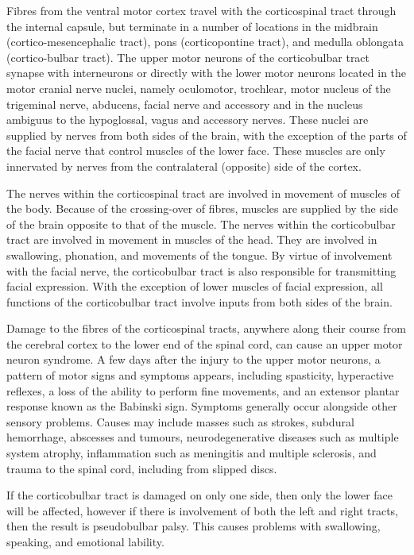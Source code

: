 Fibres from the ventral motor cortex travel with the corticospinal tract through the internal capsule, but terminate in a number of locations in the midbrain (cortico-mesencephalic tract), pons (corticopontine tract), and medulla oblongata (cortico-bulbar tract). The upper motor neurons of the corticobulbar tract synapse with interneurons or directly with the lower motor neurons located in the motor cranial nerve nuclei, namely oculomotor, trochlear, motor nucleus of the trigeminal nerve, abducens, facial nerve and accessory and in the nucleus ambiguus to the hypoglossal, vagus and accessory nerves. These nuclei are supplied by nerves from both sides of the brain, with the exception of the parts of the facial nerve that control muscles of the lower face. These muscles are only innervated by nerves from the contralateral (opposite) side of the cortex.

The nerves within the corticospinal tract are involved in movement of muscles of the body. Because of the crossing-over of fibres, muscles are supplied by the side of the brain opposite to that of the muscle. The nerves within the corticobulbar tract are involved in movement in muscles of the head. They are involved in swallowing, phonation, and movements of the tongue. By virtue of involvement with the facial nerve, the corticobulbar tract is also responsible for transmitting facial expression. With the exception of lower muscles of facial expression, all functions of the corticobulbar tract involve inputs from both sides of the brain.

Damage to the fibres of the corticospinal tracts, anywhere along their course from the cerebral cortex to the lower end of the spinal cord, can cause an upper motor neuron syndrome. A few days after the injury to the upper motor neurons, a pattern of motor signs and symptoms appears, including spasticity, hyperactive reflexes, a loss of the ability to perform fine movements, and an extensor plantar response known as the Babinski sign. Symptoms generally occur alongside other sensory problems. Causes may include masses such as strokes, subdural hemorrhage, abscesses and tumours, neurodegenerative diseases such as multiple system atrophy, inflammation such as meningitis and multiple sclerosis, and trauma to the spinal cord, including from slipped discs.

If the corticobulbar tract is damaged on only one side, then only the lower face will be affected, however if there is involvement of both the left and right tracts, then the result is pseudobulbar palsy. This causes problems with swallowing, speaking, and emotional lability.

